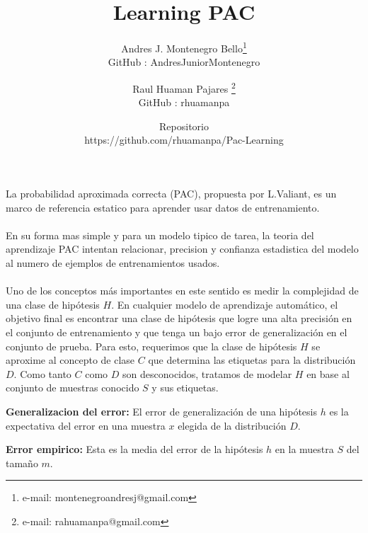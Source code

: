 \documentclass{vgtc}                          %
\title{Learning PAC}
\author{Andres J. Montenegro Bello\thanks{e-mail: montenegroandresj@gmail.com}\\      \scriptsize GitHub : AndresJuniorMontenegro%
\and Raul Huaman Pajares \thanks{e-mail: rahuamanpa@gmail.com }\\ %
     \scriptsize GitHub : rhuamanpa\\
\and Repositorio \\
     \scriptsize https://github.com/rhuamanpa/Pac-Learning
}
\begin{document}

\maketitle

La probabilidad aproximada correcta (PAC), propuesta por L.Valiant,
es un marco de referencia estatico para aprender usar datos de entrenamiento.
\\
\\
En su forma mas simple y para un modelo tipico de tarea, la teoria
del aprendizaje PAC intentan relacionar, precision y confianza 
estadistica del modelo al numero de ejemplos de entrenamientos 
usados.
\\
\\
Uno de los conceptos más importantes en este sentido es medir la
complejidad de una clase de hipótesis $H$. En cualquier modelo de
aprendizaje automático, el objetivo final es encontrar una clase de
hipótesis que logre una alta precisión en el conjunto de
entrenamiento y que tenga un bajo error de generalización en el conjunto
de prueba. Para esto, requerimos que la clase de hipótesis $H$ se
aproxime al concepto de clase $C$ que determina las etiquetas para la
distribución $D$. Como tanto $C$ como $D$ son desconocidos, tratamos
de modelar $H$ en base al conjunto de muestras conocido $S$ y sus etiquetas.

\textbf{Generalizacion del error: }
El error de generalización de una hipótesis $h$ es la expectativa del
error en una muestra $x$ elegida de la distribución $D$.

\textbf{Error empirico: }
Esta es la media del error de la hipótesis $h$ en la muestra $S$ del 
tamaño $m$.
\end{document}
